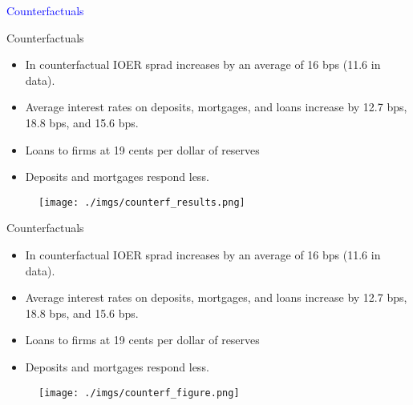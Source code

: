 \documentclass[notes,11pt, aspectratio=169]{beamer}
\begin{document}
\begin{frame}
    \textcolor{blue}{\huge{\centerline{Counterfactuals}}}
\end{frame}

\begin{frame}{Counterfactuals}
    \vspace{0.5cm}
    \begin{itemize}
        \item  In counterfactual IOER sprad increases by an average of 16 bps (11.6 in data).
        \item Average interest rates on deposits, mortgages, and loans increase by
        12.7 bps, 18.8 bps, and 15.6 bps.
        \item  Loans to firms at 19 cents per dollar of reserves
        \item Deposits and mortgages respond less.
      \end{itemize}
      
        \begin{figure}[t*]
          \centering
    
          \texttt{[image: ./imgs/counterf\_results.png]}
        \end{figure}
        
      \end{frame}

\begin{frame}{Counterfactuals}
    \vspace{0.5cm}
      \begin{itemize}
        \item  In counterfactual IOER sprad increases by an average of 16 bps (11.6 in data).
        \item Average interest rates on deposits, mortgages, and loans increase by
        12.7 bps, 18.8 bps, and 15.6 bps.
        \item  Loans to firms at 19 cents per dollar of reserves
        \item Deposits and mortgages respond less.
      \end{itemize}
      
        \begin{figure}[t*]
          \centering
    
          \texttt{[image: ./imgs/counterf\_figure.png]}
        \end{figure}
        
      \end{frame}
\end{document}
